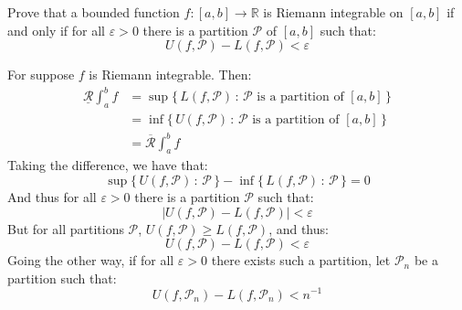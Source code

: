 \documentclass[crop=false,class=article]{standalone}                           %
\begin{document}
        \begin{problem}
            Prove that a bounded function $f:[a,b]\rightarrow\mathbb{R}$ is
            Riemann integrable on $[a,b]$ if and only if for all $\varepsilon>0$
            there is a partition $\mathcal{P}$ of $[a,b]$ such that:
            \begin{equation}
                U(f,\mathcal{P})-L(f,\mathcal{P})<\varepsilon
            \end{equation}
        \end{problem}
        \begin{solution}
            For suppose $f$ is Riemann integrable. Then:
            \begin{subequations}
                \begin{align}
                    \underline{\mathcal{R}}\int_{a}^{b}f
                    &=\sup\Big\{\,L(f,\mathcal{P})\,:\,
                        \mathcal{P}\textrm{ is a partition of }[a,b]\,\Big\}\\
                    &=\inf\Big\{\,U(f,\mathcal{P})\,:\,
                        \mathcal{P}\textrm{ is a partition of }[a,b]\,\Big\}\\
                    &=\overline{\mathcal{R}}\int_{a}^{b}f
                \end{align}
            \end{subequations}
            Taking the difference, we have that:
            \begin{equation}
                \sup\{\,U(f,\mathcal{P})\,:\,\mathcal{P}\,\}-
                \inf\{\,L(f,\mathcal{P})\,:\,\mathcal{P}\,\}=0
            \end{equation}
            And thus for all $\varepsilon>0$ there is a partition $\mathcal{P}$
            such that:
            \begin{equation}
                |U(f,\mathcal{P})-L(f,\mathcal{P})|<\varepsilon
            \end{equation}
            But for all partitions $\mathcal{P}$,
            $U(f,\mathcal{P})\geq{L}(f,\mathcal{P})$, and thus:
            \begin{equation}
                U(f,\mathcal{P})-L(f,\mathcal{P})<\varepsilon
            \end{equation}
            Going the other way, if for all $\varepsilon>0$ there exists such a
            partition, let $\mathcal{P}_{n}$ be a partition such that:
            \begin{equation}
                U(f,\mathcal{P}_{n})-L(f,\mathcal{P}_{n})<n^{\minus{1}}

\end{equation}
\end{solution}
\end{document}
